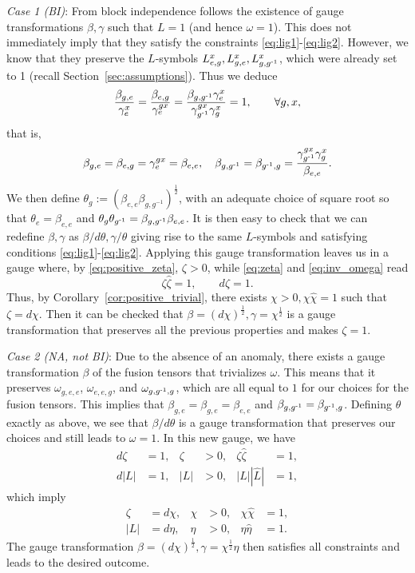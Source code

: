 \documentclass[reprint,
superscriptaddress,
amsmath,amssymb,
notitlepage,
aps,
prb,
10pt, 
tightenlines
]{revtex4-2}
\begin{document}
\textit{Case 1 (BI)}: From block independence follows the existence of gauge transformations $\beta, \gamma$ such that $L=1$ (and hence $\omega=1$). This does not immediately imply that they satisfy the constraints \eqref{eq:lig1}-\eqref{eq:lig2}. However, we know that they preserve the $L$-symbols $L_{e,g}^x,L_{g,e}^x,L_{g,g^{\text{-}1}}^x$, which were already set to 1 (recall Section~\ref{sec:assumptions}). Thus we deduce
\begin{equation}
    \dfrac{\beta_{g,e}}{\gamma^x_e} = \dfrac{\beta_{e,g}}{\gamma^{gx}_e} = \dfrac{\beta_{g,g^{\text{-}1}}\gamma^x_e}{\gamma_{g^{\text{-}1}}^{gx}\gamma^x_g}=1,\qquad\forall g,x,
\end{equation}
that is,
\begin{equation}
    \beta_{g,e} = \beta_{e,g} = \gamma^{gx}_e = \beta_{e,e},\quad \beta_{g,g^{\text{-}1}}=\beta_{g^{\text{-}1},g}=\dfrac{\gamma_{g^{\text{-}1}}^{gx}\gamma^x_g}{\beta_{e,e}}.
\end{equation}
We then define $\theta_g:=(\beta_{e,e}\beta_{g,g^{-1}})^{\frac{1}{2}}$, with an adequate choice of square root so that $\theta_e=\beta_{e,e}$ and $\theta_g\theta_{g^{\text{-}1}}=\beta_{g,g^{\text{-}1}}\beta_{e,e}$. It is then easy to check that we can redefine $\beta,\gamma$ as $\beta/d\theta, \gamma/\theta$ giving rise to the same $L$-symbols and satisfying conditions \eqref{eq:lig1}-\eqref{eq:lig2}. Applying this gauge transformation leaves us in a gauge where, by \eqref{eq:positive_zeta}, $\zeta>0$, while \eqref{eq:zeta} and \eqref{eq:inv_omega} read
\begin{equation}
    \zeta\hat\zeta=1,\qquad d\zeta =1.
\end{equation}
Thus, by Corollary~\ref{cor:positive_trivial}, there exists $\chi>0, \chi\hat\chi=1$ such that $\zeta=d\chi$. Then it can be checked that $\beta=(d\chi)^{\frac{1}{2}}, \gamma=\chi^{\frac{1}{2}}$ is a gauge transformation that preserves all the previous properties and makes $\zeta=1$.

\textit{Case 2 (NA, not BI)}:
Due to the absence of an anomaly, there exists a gauge transformation $\beta$ of the fusion tensors that trivializes $\omega$. This means that it preserves $\omega_{g, e, e}$, $\omega_{e, e, g}$, and $\omega_{g, g^{\text{-}1}, g}$, which are all equal to $1$ for our choices for the fusion tensors. This implies that $\beta_{g,e}=\beta_{g,e}=\beta_{e,e}$ and $\beta_{g,g^{\text{-}1}}=\beta_{g^{\text{-}1},g}$. Defining $\theta$ exactly as above, we see that $\beta/d\theta$ is a gauge transformation that preserves our choices and still leads to $\omega=1$. In this new gauge, we have
\begin{align}
    d\zeta&=1, & \zeta&>0, & \zeta\hat\zeta &=1,\\
        d|L|&=1, & |L|&>0, & |L||\hat L| &=1,\label{eq:absLcocycle}
\end{align}
which imply
\begin{align}
\zeta&=d\chi, &\chi&>0,& \chi\hat\chi&=1,\\
|L|&=d\eta, &\eta&>0,& \eta\hat\eta&=1.\label{eq:absLtrivial}
\end{align}
The gauge transformation $\beta=(d\chi)^{\frac{1}{2}}, \gamma=\chi^{\frac{1}{2}}\eta$ then satisfies all constraints and leads to the desired outcome.
\end{document}
